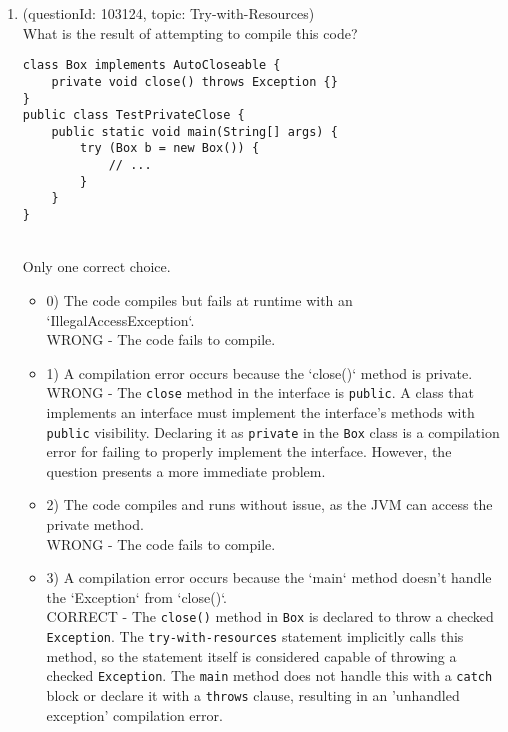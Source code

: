 \documentclass[12pt]{article}
\begin{document}
\begin{enumerate}[label=(\arabic*)]
\begin{itemize}
\end{itemize}
\item (questionId: 103124, topic: Try-with-Resources) \\ 
What is the result of attempting to compile this code?
\begin{verbatim}
class Box implements AutoCloseable {
    private void close() throws Exception {}
}
public class TestPrivateClose {
    public static void main(String[] args) {
        try (Box b = new Box()) {
            // ...
        }
    }
}
\end{verbatim}
\\ \noindent Only one correct choice. 
\begin{itemize}
\item 0) The code compiles but fails at runtime with an `IllegalAccessException`.
 \\ 
WRONG - The code fails to compile.

\item 1) A compilation error occurs because the `close()` method is private.
 \\ 
WRONG - The \verb|close| method in the interface is \verb|public|. A class that implements an interface must implement the interface's methods with \verb|public| visibility. Declaring it as \verb|private| in the \verb|Box| class is a compilation error for failing to properly implement the interface. However, the question presents a more immediate problem.

\item 2) The code compiles and runs without issue, as the JVM can access the private method.
 \\ 
WRONG - The code fails to compile.

\item 3) A compilation error occurs because the `main` method doesn't handle the `Exception` from `close()`.
 \\ 
CORRECT - The \verb|close()| method in \verb|Box| is declared to throw a checked \verb|Exception|. The \verb|try-with-resources| statement implicitly calls this method, so the statement itself is considered capable of throwing a checked \verb|Exception|. The \verb|main| method does not handle this with a \verb|catch| block or declare it with a \verb|throws| clause, resulting in an 'unhandled exception' compilation error.


\end{itemize}
\end{enumerate}
\end{document}
